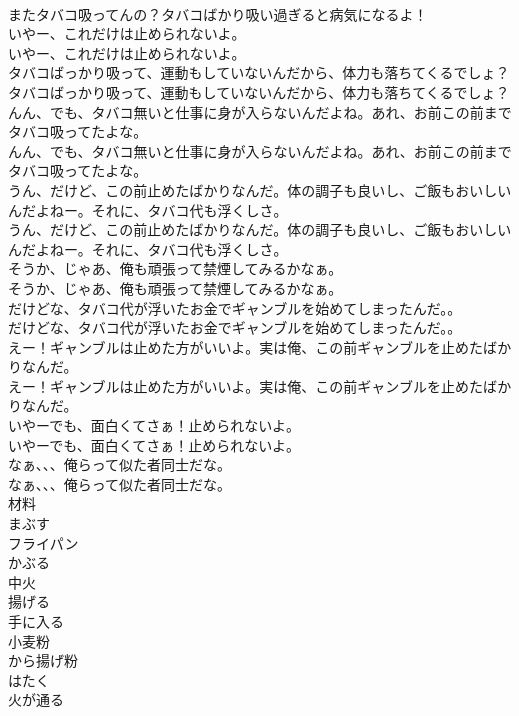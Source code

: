 \documentclass[8pt]{extreport}
\begin{document}
\begin{CJK}{UTF8}{min}
\\	またタバコ吸ってんの？タバコばかり吸い過ぎると病気になるよ！ 
\\	いやー、これだけは止められないよ。	
\\	いやー、これだけは止められないよ。 
\\	タバコばっかり吸って、運動もしていないんだから、体力も落ちてくるでしょ？	
\\	タバコばっかり吸って、運動もしていないんだから、体力も落ちてくるでしょ？ 
\\	んん、でも、タバコ無いと仕事に身が入らないんだよね。あれ、お前この前までタバコ吸ってたよな。	
\\	んん、でも、タバコ無いと仕事に身が入らないんだよね。あれ、お前この前までタバコ吸ってたよな。 
\\	うん、だけど、この前止めたばかりなんだ。体の調子も良いし、ご飯もおいしいんだよねー。それに、タバコ代も浮くしさ。	
\\	うん、だけど、この前止めたばかりなんだ。体の調子も良いし、ご飯もおいしいんだよねー。それに、タバコ代も浮くしさ。 
\\	そうか、じゃあ、俺も頑張って禁煙してみるかなぁ。	
\\	そうか、じゃあ、俺も頑張って禁煙してみるかなぁ。 
\\	だけどな、タバコ代が浮いたお金でギャンブルを始めてしまったんだ。。	
\\	だけどな、タバコ代が浮いたお金でギャンブルを始めてしまったんだ。。 
\\	えー！ギャンブルは止めた方がいいよ。実は俺、この前ギャンブルを止めたばかりなんだ。	
\\	えー！ギャンブルは止めた方がいいよ。実は俺、この前ギャンブルを止めたばかりなんだ。 
\\	いやーでも、面白くてさぁ！止められないよ。	
\\	いやーでも、面白くてさぁ！止められないよ。 
\\	なぁ、、、俺らって似た者同士だな。	
\\	なぁ、、、俺らって似た者同士だな。 
\\	材料
\\	まぶす
\\	フライパン
\\	かぶる
\\	中火
\\	揚げる
\\	手に入る
\\	小麦粉
\\	から揚げ粉
\\	はたく
\\	火が通る

\end{CJK}
\end{document}
